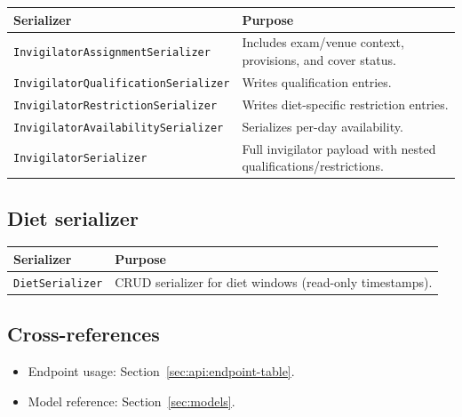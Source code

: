\begin{longtable}{p{}p{}}
\toprule
\textbf{Serializer} & \textbf{Purpose} \\
\midrule
\texttt{InvigilatorAssignmentSerializer} & Includes exam/venue context, provisions, and cover status. \\
\texttt{InvigilatorQualificationSerializer} & Writes qualification entries. \\
\texttt{InvigilatorRestrictionSerializer} & Writes diet-specific restriction entries. \\
\texttt{InvigilatorAvailabilitySerializer} & Serializes per-day availability. \\
\texttt{InvigilatorSerializer} & Full invigilator payload with nested qualifications/restrictions. \\
\bottomrule
\end{longtable}

\subsection{Diet serializer}
\label{subsec:api:serializers:diets}

\begin{longtable}{p{}p{}}
\toprule
\textbf{Serializer} & \textbf{Purpose} \\
\midrule
\texttt{DietSerializer} & CRUD serializer for diet windows (read-only timestamps). \\
\bottomrule
\end{longtable}

\subsection{Cross-references}
\label{subsec:api:serializers:links}

\begin{itemize}
  \item Endpoint usage: Section~\ref{sec:api:endpoint-table}.
  \item Model reference: Section~\ref{sec:models}.
\end{itemize}
